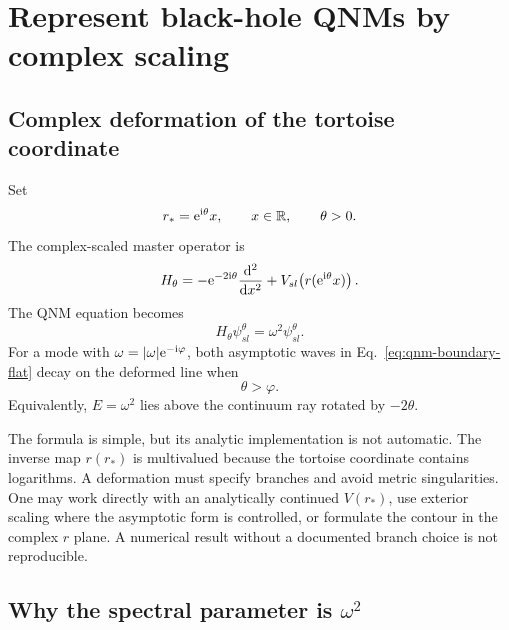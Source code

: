 \section{Represent black-hole QNMs by complex scaling}
\label{sec:bh-complex-scaling}

\subsection{Complex deformation of the tortoise coordinate}
\label{subsec:bh-csm-map}

Set
\begin{equation}
  r_*=\mathrm{e}^{\mathrm{i}\theta}x,
  \qquad x\in\mathbb{R},
  \qquad \theta>0 .
  \label{eq:bh-complex-scaling}
\end{equation}
The complex-scaled master operator is
\begin{equation}
  H_{\theta}
  =-\mathrm{e}^{-2\mathrm{i}\theta}
  \frac{\mathrm{d}^2}{\mathrm{d} x^2}
  +V_{sl}\!\left(r(\mathrm{e}^{\mathrm{i}\theta}x)\right) .
  \label{eq:bh-H-theta}
\end{equation}
The QNM equation becomes
\begin{equation}
  H_\theta\psi_{sl}^{\theta}
  =\omega^2\psi_{sl}^{\theta} .
  \label{eq:bh-csm-eigenproblem}
\end{equation}
For a mode with $\omega=|\omega|\mathrm{e}^{-\mathrm{i}\varphi}$, both asymptotic waves in
Eq.~\eqref{eq:qnm-boundary-flat} decay on the deformed line when
\begin{equation}
  \theta>\varphi .
  \label{eq:bh-frequency-exposure}
\end{equation}
Equivalently, $E=\omega^2$ lies above the continuum ray rotated by
$-2\theta$.

The formula is simple, but its analytic implementation is not automatic.
The inverse map $r(r_*)$ is multivalued because the tortoise coordinate
contains logarithms.  A deformation must specify branches and avoid metric
singularities.  One may work directly with an analytically continued
$V(r_*)$, use exterior scaling where the asymptotic form is controlled, or
formulate the contour in the complex $r$ plane.  A numerical result without a
documented branch choice is not reproducible.

\subsection{Why the spectral parameter is
\texorpdfstring{$\omega^2$}{omega squared}}
\label{subsec:omega-square}

